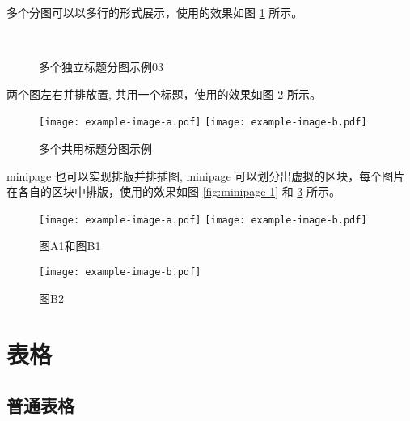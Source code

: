 \documentclass[report, twoside, UTF8, AutoFakeBold = 1, AutoFakeSlant, zihao = -4]{config}
\begin{document}
多个分图可以以多行的形式展示，使用的效果如图 \ref{fig:multi-image-03} 所示。

\begin{figure}[H]
    \centering
    \\
    \caption{多个独立标题分图示例03}
    \label{fig:multi-image-03}
\end{figure}

两个图左右并排放置, 共用一个标题，使用的效果如图 \ref{fig:multi-image-04} 所示。

\begin{figure}[H]
\centering
    \texttt{[image: example-image-a.pdf]}\hfill
    \texttt{[image: example-image-b.pdf]}
    \caption{多个共用标题分图示例}
    \label{fig:multi-image-04}
\end{figure}

minipage 也可以实现排版并排插图, minipage 可以划分出虚拟的区块，每个图片在各自的区块中排版，使用的效果如图 \ref{fig:minipage-1} 和  \ref{fig:minipage-2} 所示。

\begin{figure}[H]
    \begin{minipage}[t]{0.49\linewidth} %
        \centering
        \texttt{[image: example-image-a.pdf]}
        \texttt{[image: example-image-b.pdf]}
        \caption{图A1和图B1}
        \label{fig:minipage-1}
    \end{minipage}
    \hfill
    \begin{minipage}[t]{0.4\linewidth} %
        \centering
        \texttt{[image: example-image-b.pdf]}
        \caption{图B2}
        \label{fig:minipage-2}
    \end{minipage}
\end{figure}

\section{表格}

\subsection{普通表格}
\end{document}
